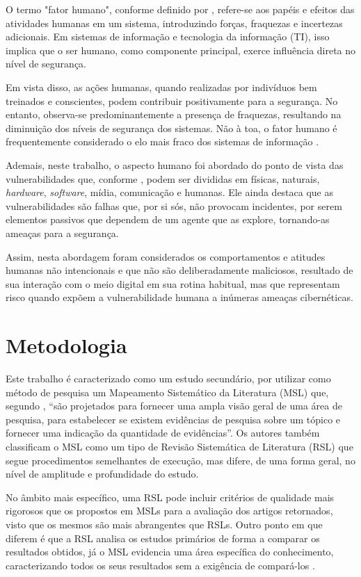 \documentclass[portuguese]{textolivre}
\begin{document}
O termo "fator humano", conforme definido por \textcite{wang_cognitive_2008}, refere-se aos papéis e efeitos das atividades humanas em um sistema, introduzindo forças, fraquezas e incertezas adicionais. Em sistemas de informação e tecnologia da informação (TI), isso implica que o ser humano, como componente principal, exerce influência direta no nível de segurança.

Em vista disso, as ações humanas, quando realizadas por indivíduos bem treinados e conscientes, podem contribuir positivamente para a segurança. No entanto, observa-se predominantemente a presença de fraquezas, resultando na diminuição dos níveis de segurança dos sistemas. Não à toa, o fator humano é frequentemente considerado o elo mais fraco dos sistemas de informação \cite{pollini_leveraging_2022,kobis_human_2021}.

Ademais, neste trabalho, o aspecto humano foi abordado do ponto de vista das vulnerabilidades que, conforme \textcite{semola_gestao_2014}, podem ser divididas em físicas, naturais, \textit{hardware}, \textit{software}, mídia, comunicação e humanas. Ele ainda destaca que as vulnerabilidades são falhas que, por si sós, não provocam incidentes, por serem elementos passivos que dependem de um agente que as explore, tornando-as ameaças para a segurança.

Assim, nesta abordagem foram considerados os comportamentos e atitudes humanas não intencionais e que não são deliberadamente maliciosos, resultado de sua interação com o meio digital em sua rotina habitual, mas que representam risco quando expõem a vulnerabilidade humana a inúmeras ameaças cibernéticas.


\section{Metodologia}\label{sec-conduta}
Este trabalho é caracterizado como um estudo secundário, por utilizar como método de pesquisa um Mapeamento Sistemático da Literatura (MSL) que, segundo \textcite[p. 52]{kitchenham_guidelines_2007}, “são projetados para fornecer uma ampla visão geral de uma área de pesquisa, para estabelecer se existem evidências de pesquisa sobre um tópico e fornecer uma indicação da quantidade de evidências”. Os autores também classificam o MSL como um tipo de Revisão Sistemática de Literatura (RSL) que segue procedimentos semelhantes de execução, mas difere, de uma forma geral, no nível de amplitude e profundidade do estudo.

No âmbito mais específico, uma RSL pode incluir critérios de qualidade mais rigorosos que os propostos em MSLs para a avaliação dos artigos retornados, visto que os mesmos são mais abrangentes que RSLs. Outro ponto em que diferem é que a RSL analisa os estudos primários de forma a comparar os resultados obtidos, já o MSL evidencia uma área específica do conhecimento, caracterizando todos os seus resultados sem a exigência de compará-los \cite{cabrejos_planejamento_2018}.
\end{document}
